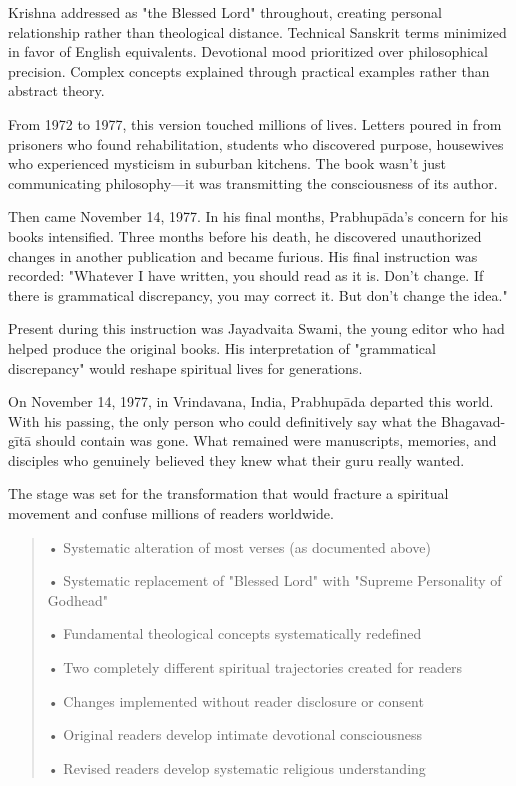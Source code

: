 \documentclass[11pt,twoside]{book}
\newenvironment{chapterfindingsbox}%
{\begin{quote}\begin{itemize}\setlength{\itemsep}{0.3em}}%
{\end{itemize}\end{quote}}
\begin{document}
Krishna addressed as "the Blessed Lord" throughout, creating personal relationship rather than theological distance. Technical Sanskrit terms minimized in favor of English equivalents. Devotional mood prioritized over philosophical precision. Complex concepts explained through practical examples rather than abstract theory.

From 1972 to 1977, this version touched millions of lives. Letters poured in from prisoners who found rehabilitation, students who discovered purpose, housewives who experienced mysticism in suburban kitchens. The book wasn't just communicating philosophy—it was transmitting the consciousness of its author.

Then came November 14, 1977. In his final months, Prabhupāda's concern for his books intensified. Three months before his death, he discovered unauthorized changes in another publication and became furious. His final instruction was recorded: "Whatever I have written, you should read as it is. Don't change. If there is grammatical discrepancy, you may correct it. But don't change the idea."

Present during this instruction was Jayadvaita Swami, the young editor who had helped produce the original books. His interpretation of "grammatical discrepancy" would reshape spiritual lives for generations.

On November 14, 1977, in Vrindavana, India, Prabhupāda departed this world. With his passing, the only person who could definitively say what the Bhagavad-gītā should contain was gone. What remained were manuscripts, memories, and disciples who genuinely believed they knew what their guru really wanted.

The stage was set for the transformation that would fracture a spiritual movement and confuse millions of readers worldwide.

\begin{chapterfindingsbox}
• Systematic alteration of most verses (as documented above)

• Systematic replacement of "Blessed Lord" with "Supreme Personality of Godhead"

• Fundamental theological concepts systematically redefined

• Two completely different spiritual trajectories created for readers

• Changes implemented without reader disclosure or consent

• Original readers develop intimate devotional consciousness

• Revised readers develop systematic religious understanding
\end{chapterfindingsbox}
\end{document}

